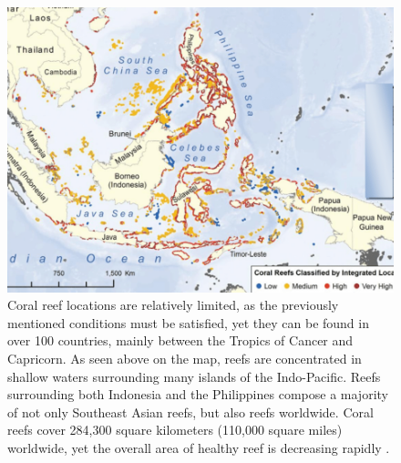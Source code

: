 \documentclass{book}\usepackage{knitr}
\begin{document}
\begin{knitrout}
\begin{kframe}
\begin{figure}
\includegraphics[width=\linewidth]{images/reefmap}
\caption{Coral reef locations are relatively limited, as the previously mentioned conditions must be satisfied, yet they can be found in over 100 countries, mainly between the Tropics of Cancer and Capricorn. As seen above on the map, reefs are concentrated in shallow waters surrounding many islands of the Indo-Pacific. Reefs surrounding both Indonesia and the Philippines compose a majority of not only Southeast Asian reefs, but also reefs worldwide.   Coral reefs cover 284,300 square kilometers (110,000 square miles) worldwide, yet the overall area of healthy reef is decreasing rapidly \citep{Watlas}.}
\label{fig:Map of Southeast Asian Coral Reefs}
\end{figure}


\end{kframe}
\end{knitrout}
\end{document}
